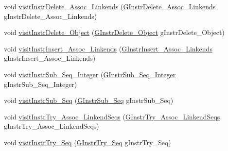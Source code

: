 \begin{DoxyCompactItemize}
\item 
void \hyperlink{classorg_1_1tzi_1_1use_1_1gen_1_1assl_1_1statics_1_1_basic_instruction_coverage_calulator_aca636d816f1cd65447cdca3dd53c5623}{visit\-Instr\-Delete\-\_\-\-Assoc\-\_\-\-Linkends} (\hyperlink{classorg_1_1tzi_1_1use_1_1gen_1_1assl_1_1statics_1_1_g_instr_delete___assoc___linkends}{G\-Instr\-Delete\-\_\-\-Assoc\-\_\-\-Linkends} g\-Instr\-Delete\-\_\-\-Assoc\-\_\-\-Linkends)
\item 
void \hyperlink{classorg_1_1tzi_1_1use_1_1gen_1_1assl_1_1statics_1_1_basic_instruction_coverage_calulator_af10d8f7ed76537ffdad5c7b6fed3492b}{visit\-Instr\-Delete\-\_\-\-Object} (\hyperlink{classorg_1_1tzi_1_1use_1_1gen_1_1assl_1_1statics_1_1_g_instr_delete___object}{G\-Instr\-Delete\-\_\-\-Object} g\-Instr\-Delete\-\_\-\-Object)
\item 
void \hyperlink{classorg_1_1tzi_1_1use_1_1gen_1_1assl_1_1statics_1_1_basic_instruction_coverage_calulator_a6754f8876fce375c7ded5516b5d37379}{visit\-Instr\-Insert\-\_\-\-Assoc\-\_\-\-Linkends} (\hyperlink{classorg_1_1tzi_1_1use_1_1gen_1_1assl_1_1statics_1_1_g_instr_insert___assoc___linkends}{G\-Instr\-Insert\-\_\-\-Assoc\-\_\-\-Linkends} g\-Instr\-Insert\-\_\-\-Assoc\-\_\-\-Linkends)
\item 
void \hyperlink{classorg_1_1tzi_1_1use_1_1gen_1_1assl_1_1statics_1_1_basic_instruction_coverage_calulator_a29f0792ea2074b2c84d246c2305867a3}{visit\-Instr\-Sub\-\_\-\-Seq\-\_\-\-Integer} (\hyperlink{classorg_1_1tzi_1_1use_1_1gen_1_1assl_1_1statics_1_1_g_instr_sub___seq___integer}{G\-Instr\-Sub\-\_\-\-Seq\-\_\-\-Integer} g\-Instr\-Sub\-\_\-\-Seq\-\_\-\-Integer)
\item 
void \hyperlink{classorg_1_1tzi_1_1use_1_1gen_1_1assl_1_1statics_1_1_basic_instruction_coverage_calulator_a3b21ac108e8c7037f39284aea5387712}{visit\-Instr\-Sub\-\_\-\-Seq} (\hyperlink{classorg_1_1tzi_1_1use_1_1gen_1_1assl_1_1statics_1_1_g_instr_sub___seq}{G\-Instr\-Sub\-\_\-\-Seq} g\-Instr\-Sub\-\_\-\-Seq)
\item 
void \hyperlink{classorg_1_1tzi_1_1use_1_1gen_1_1assl_1_1statics_1_1_basic_instruction_coverage_calulator_a76d29594ea36fcea4d0d07ceafa738e6}{visit\-Instr\-Try\-\_\-\-Assoc\-\_\-\-Linkend\-Seqs} (\hyperlink{classorg_1_1tzi_1_1use_1_1gen_1_1assl_1_1statics_1_1_g_instr_try___assoc___linkend_seqs}{G\-Instr\-Try\-\_\-\-Assoc\-\_\-\-Linkend\-Seqs} g\-Instr\-Try\-\_\-\-Assoc\-\_\-\-Linkend\-Seqs)
\item 
void \hyperlink{classorg_1_1tzi_1_1use_1_1gen_1_1assl_1_1statics_1_1_basic_instruction_coverage_calulator_afe1d03c5122c1171f2b719df98b1ad28}{visit\-Instr\-Try\-\_\-\-Seq} (\hyperlink{classorg_1_1tzi_1_1use_1_1gen_1_1assl_1_1statics_1_1_g_instr_try___seq}{G\-Instr\-Try\-\_\-\-Seq} g\-Instr\-Try\-\_\-\-Seq)

\end{DoxyCompactItemize}
